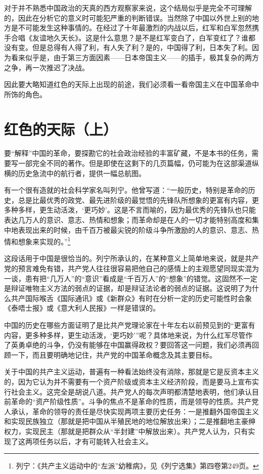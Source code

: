 \documentclass[10pt]{book}
\begin{document}
对于并不熟悉中国政治的天真的西方观察家来说，这个结局似乎是完全不可理解的，因此在分析它的意义时可能犯严重的判断错误。当然除了中国以外世上别的地方是不可能发生这种事情的。在经过了十年最激烈的内战以后，红军和白军忽然携手合唱《友谊地久天长》。这是什么意思？是不是红军变白了，白军变红了？谁都没有变。但是总得有人得了利，有人失了利？是的，中国得了利，日本失了利。因为看来似乎是，由于第三方面因素——日本帝国主义——的插手，极其复杂的两方之争，再一次推迟了决战。

因此要大略知道红色的天际上出现的前途，我们必须看一看帝国主义在中国革命中所饰的角色。

\section{红色的天际（上）}

要“解释”中国的革命，要探勘它的社会政治经验的丰富矿藏，不是本书的任务，需要写一部完全不同的著作。但是即使在这剩下的几页篇幅，仍可能为在这部渠道纵横的历史急流中的航行者，提供一幅总航图。

有一个很有造就的社会科学家名叫列宁。他曾写道：“一般历史，特别是革命的历史，总是比最优秀的政党、最先进阶级的最觉悟的先锋队所想象的更富有内容，更多种多样，更生动活泼，‘更巧妙’。这是不言而喻的，因为最优秀的先锋队也只能表达几万人的意识、意志、热情和想象；而革命却是在人的一切才能特别高度和集中地表现出来的时候，由千百万被最尖锐的阶级斗争所激励的人的意识、意志、热情和想象来实现的。”\footnote{列宁：《共产主义运动中的“左派”幼稚病》，见《列宁选集》第四卷第249页。}

这段话用于中国是很恰当的。列宁所承认的，在某种意义上简单地来说，就是共产党的预言难免有错，共产党人往往很容易把他自己的感情上的主观愿望同现实混为一谈，患有把“几万人”的“意识”看成是“千百万人”的“想象”的错觉。这固然不一定是辩证唯物主义方法的弱点的证据，却是辩证法论者的弱点的证据。这说明了为什么共产国际喉舌《国际通讯》或《新群众》有时在分析一定的历史可能性时会象《泰唔士报》或《意大利人民报》一样是错误的。

中国的历史在哪些方面证明了是比共产党理论家在十年左右以前预见到的“更富有内容，更多种多样，更生动活泼，‘更巧妙’”呢？具体地来说，为什么红军尽管作了英勇卓绝的斗争，仍没有能够在中国赢得政权？要回答这一问题，我们必须再回顾一下，而且要明确地记住，共产党的中国革命概念及其主要目标。

关于中国的共产主义运动，普遍有一种看法始终没有消除，那就是它是反资本主义的，因为它认为并不需要有一个资产阶级或资本主义经济阶段，而是要马上宣布实行社会主义。这完全是胡说八道。共产党人的每次声明都清楚地表明，他们承认目前革命的“资产阶级性质”。斗争的焦点不是革命的性质，而是领导的性质。共产党人承认，革命的领导的责任是尽快实现两项主要历史任务：一是推翻外国帝国主义和实现民族独立（那就是把中国从半殖民地的地位解放出来）；二是推翻地主豪绅权力，实现民主（那就是把群众从“半封建”中解放出来）。共产党人认为，只有实现了这两项任务以后，才有可能转入社会主义。
\end{document}
